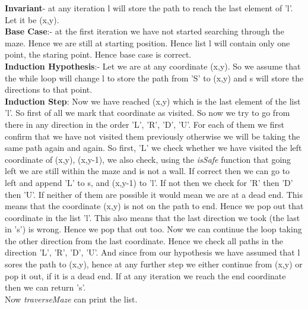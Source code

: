 \documentclass{article}
\begin{document}
\textbf{Invariant}- at any iteration l will store the path to reach the last element of 'l'. Let it be (x,y).\\
\textbf{Base Case}:- at the first iteration we have not started searching through the maze. Hence we are still at starting position. Hence list l will contain only one point, the staring point. Hence base case is correct.\\
\textbf{Induction Hypothesis}:- Let we are at any coordinate (x,y). So we assume that the while loop will change l to store the path from 'S' to (x,y) and s will store the directions to that point.\\\textbf{}
\textbf{Induction Step}:  Now we have reached (x,y) which is the last element of the list 'l'. So first of all we mark that coordinate as visited. So now we try to go from there in any direction in the order 'L', 'R', 'D', 'U'. For each of them we first confirm that we have not visited them previously otherwise we will be taking the same path again and again. So first, 'L' we check whether we have visited the left coordinate of (x,y), (x,y-1), we also check, using the \emph{isSafe} function that going left we are still within the maze and is not a wall. If correct then we can go to left and append 'L' to s, and (x,y-1) to 'l'. If not then we check for 'R' then 'D' then 'U'. If neither of them are possible it would mean we are at a dead end. This means that the coordinate (x,y) is not on the path to end. Hence we pop out that coordinate in the list 'l'. This also means that the last direction we took (the last in 's') is wrong. Hence we pop that out too. Now we can continue the loop taking the other direction from the last coordinate. Hence we check all paths in the direction 'L', 'R', 'D', 'U'. And since from our hypothesis we have assumed that l sores the path to (x,y), hence at any further step we either continue from (x,y) or pop it out, if it is a dead end. If at any iteration we reach the end coordinate then we can return 's'.\\
Now \emph{traverseMaze} can print the list.
\end{document}
